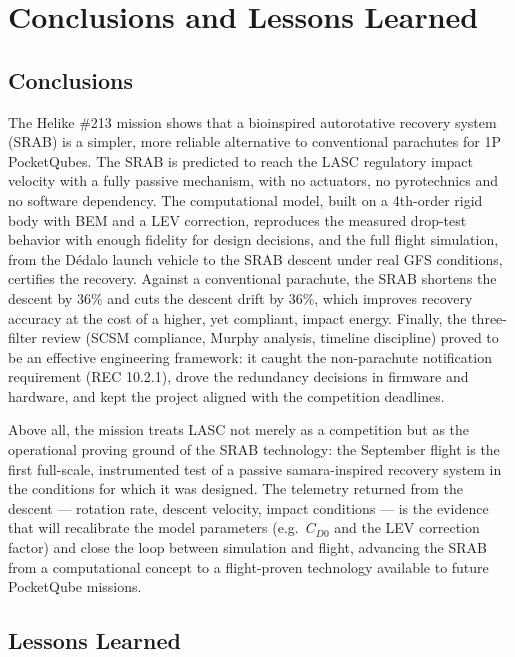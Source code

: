 \section{Conclusions and Lessons Learned}

\subsection{Conclusions}

The Helike \#213 mission shows that a bioinspired autorotative
recovery system (SRAB) is a simpler, more reliable
alternative to conventional parachutes for 1P PocketQubes. The SRAB
is predicted to reach the LASC regulatory impact velocity with a fully passive
mechanism, with no actuators, no pyrotechnics and no software
dependency. The computational model, built on a 4th-order rigid body
with BEM and a LEV correction, reproduces the measured drop-test
behavior with enough fidelity for design decisions, and the full
flight simulation, from the Dédalo launch vehicle to the SRAB descent
under real GFS conditions, certifies the recovery. Against a
conventional parachute, the SRAB shortens the descent by 36\% and cuts
the descent drift by 36\%, which improves recovery accuracy at the cost of a
higher, yet compliant, impact energy. Finally, the three-filter review
(SCSM compliance, Murphy analysis, timeline discipline) proved to be
an effective engineering framework: it caught the non-parachute
notification requirement (REC 10.2.1), drove the redundancy decisions
in firmware and hardware, and kept the project aligned with the
competition deadlines.

Above all, the mission treats LASC not merely as a competition but as
the operational proving ground of the SRAB technology: the September
flight is the first full-scale, instrumented test of a passive
samara-inspired recovery system in the conditions for which it was
designed. The telemetry returned from the descent --- rotation rate,
descent velocity, impact conditions --- is the evidence that will
recalibrate the model parameters (e.g.\ $C_{D0}$ and the LEV
correction factor) and close the loop between simulation and flight,
advancing the SRAB from a computational concept to a flight-proven
technology available to future PocketQube missions.

\subsection{Lessons Learned}

